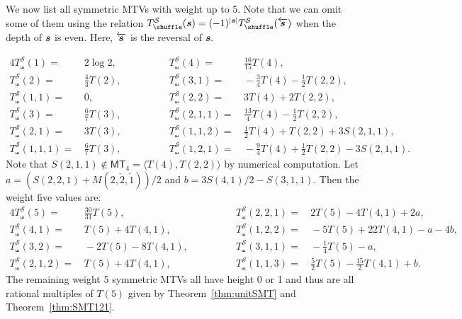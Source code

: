 \documentclass{article}
\newcommand{\MTV}{\mathsf {MT}}
\newcommand{\sha}{\shuffle}
\newcommand{\Sy}{{\mathcal S}}
\newcommand{\bfs}{{\boldsymbol{\sl{s}}}}
\theoremstyle{plain}
\theoremstyle{definition}
\begin{document}
We now list all symmetric MTVs with weight up to 5. Note that we can omit some of them using the relation $T_\sha^\Sy(\bfs)=(-1)^{|\bfs|}T_\sha^\Sy(\overleftarrow{\bfs})$ when the depth of $\bfs$ is even. Here, $\overleftarrow{\bfs}$ is the reversal of $\bfs.$

\begin{alignat*}{4}
T_\sha^\Sy(1)=&\, 2\log 2,\quad &  T_\sha^\Sy(4)=&\,\frac{16}{15}T(4),\\
T_\sha^\Sy(2)=&\, \frac43 T(2),\quad &   T_\sha^\Sy(3,1)=&\,  -\frac34T(4)-\frac12T(2,2),\\
T_\sha^\Sy(1,1)=&\, 0,\quad &  T_\sha^\Sy(2,2)=&\, 3T(4)+2T(2,2),\\
T_\sha^\Sy(3)=&\, \frac67 T(3),\quad &  T_\sha^\Sy(2,1,1)=&\,  \frac{13}{4}T(4)-\frac12 T(2,2), \\
T_\sha^\Sy(2,1)=&\,  3T(3),\quad &  T_\sha^\Sy(1,1,2)=&\,  \frac{1}{2}T(4)+T(2,2)+3S(2,1,1), \\
T_\sha^\Sy(1,1,1)=&\, \frac67 T(3),\qquad \qquad &  T_\sha^\Sy(1,2,1)=&\,  -\frac{9}{4}T(4)+\frac12T(2,2)-3S(2,1,1).
\end{alignat*}
Note that $S(2,1,1)\not\in \MTV_4=\langle T(4),T(2,2)\rangle$ by numerical computation.
Let $a=(S(2,2,1)+M(2,\check{2},\check{1}))/2$ and $b=3S(4,1)/2-S(3,1,1)$. Then the weight five values are:
\begin{alignat*}{4}
T_\sha^\Sy(5)=&\,\frac{30}{31}T(5),\quad &  T_\sha^\Sy(2,2,1)=&\, 2T(5)-4T(4,1)+2a, \\
T_\sha^\Sy(4,1)=&\, T(5)+4T(4,1),\quad &  T_\sha^\Sy(1,2,2)=&\, -5T(5)+22T(4,1)-a-4b, \\
T_\sha^\Sy(3,2)=&\, -2T(5)-8 T(4,1),\qquad \qquad & T_\sha^\Sy(3,1,1)=&\, -\frac{1}{4}T(5)-a, \\
T_\sha^\Sy(2,1,2)=&\, T(5)+4T(4,1), \quad &
T_\sha^\Sy(1,1,3)=&\,  \frac{5}{2}T(5)-\frac{15}2 T(4,1)+b.
\end{alignat*}
The remaining weight 5 symmetric MTVs all have height 0 or 1 and thus are all rational multiples of $T(5)$ given by Theorem~\ref{thm:unitSMT} and Theorem~\ref{thm:SMT121}.
\end{document}
